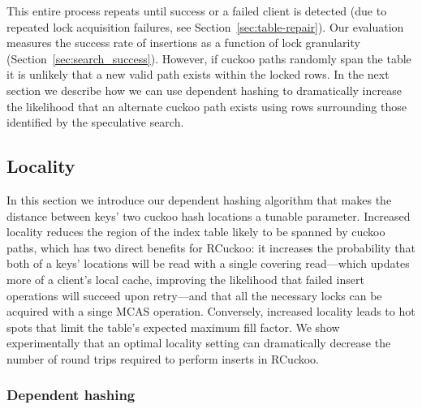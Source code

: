 This entire process repeats until success or a failed client is
detected (due to repeated lock acquisition failures, see
Section~\ref{sec:table-repair}).  Our evaluation measures the success
rate of insertions as a function of lock granularity
(Section~\ref{sec:search_success}).
However, if cuckoo paths randomly span the table it is unlikely that a
new valid path exists within the locked rows.  In the next section we
describe how we can use dependent hashing to dramatically increase the
likelihood that an alternate cuckoo path exists using rows surrounding
those identified by the speculative search.




\subsection{Locality}



In this section we introduce our dependent hashing algorithm that
makes the distance between keys' two cuckoo hash locations a tunable
parameter.  Increased locality reduces the region of the index table likely
to be spanned by cuckoo paths, which has two direct benefits for
RCuckoo: it increases the probability that both of a keys' locations
will be read with a single covering read---which updates more of a
client's local cache, improving the likelihood that failed insert
operations will succeed upon retry---and that all the necessary locks
can be acquired with a singe MCAS operation.  Conversely, increased
locality leads to hot spots that limit the table's expected maximum
fill factor.  We show experimentally that an optimal locality setting
can dramatically decrease the number of round trips required to
perform inserts in RCuckoo.


\subsubsection{Dependent hashing}
\label{sec:dephash}


